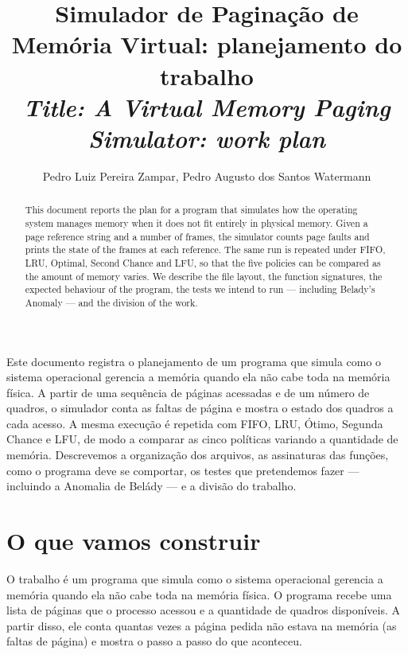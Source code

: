 \documentclass[12pt]{article}
\title{Simulador de Paginação de Memória Virtual:
planejamento do trabalho \\
\medskip
\small{
    \textit{Title: A Virtual Memory Paging Simulator: work plan}
}
}
\author{Pedro Luiz Pereira Zampar\inst{1}, Pedro Augusto dos Santos Watermann\inst{1}}
\begin{document}
\maketitle

\thispagestyle{plain}

\begin{abstract}
This document reports the plan for a program that simulates how the operating
system manages memory when it does not fit entirely in physical memory. Given a
page reference string and a number of frames, the simulator counts page faults
and prints the state of the frames at each reference. The same run is repeated
under FIFO, LRU, Optimal, Second Chance and LFU, so that the five policies can
be compared as the amount of memory varies. We describe the file layout, the
function signatures, the expected behaviour of the program, the tests we intend
to run --- including Belady's Anomaly --- and the division of the work.
\end{abstract}


\begin{resumo}
Este documento registra o planejamento de um programa que simula como o sistema
operacional gerencia a memória quando ela não cabe toda na memória física. A
partir de uma sequência de páginas acessadas e de um número de quadros, o
simulador conta as faltas de página e mostra o estado dos quadros a cada acesso.
A mesma execução é repetida com FIFO, LRU, Ótimo, Segunda Chance e LFU, de modo
a comparar as cinco políticas variando a quantidade de memória. Descrevemos a
organização dos arquivos, as assinaturas das funções, como o programa deve se
comportar, os testes que pretendemos fazer --- incluindo a Anomalia de Belády
--- e a divisão do trabalho.
\end{resumo}


\section{O que vamos construir}
\label{sec:intro}

O trabalho é um programa que simula como o sistema operacional gerencia a
memória quando ela não cabe toda na memória física. O programa recebe uma lista
de páginas que o processo acessou e a quantidade de quadros disponíveis. A
partir disso, ele conta quantas vezes a página pedida não estava na memória (as
faltas de página) e mostra o passo a passo do que aconteceu.
\end{document}

